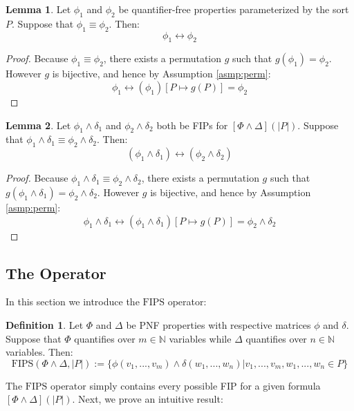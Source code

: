 \documentclass[12pt]{article}
\theoremstyle{definition}
\newtheorem{lemma}{Lemma}
\newtheorem{definition}{Definition}
\theoremstyle{remark}
\newcommand{\fips}{\text{FIPS}}
\begin{document}
\begin{lemma}
  \label{lem:phi-eqiv-bijec}
  Let $\phi_1$ and $\phi_2$ be quantifier-free properties parameterized by the sort $P$.  Suppose that $\phi_1 \equiv \phi_2$.  Then:
  $$\phi_1 \leftrightarrow \phi_2$$
\end{lemma}
\begin{proof}
  Because $\phi_1 \equiv \phi_2$, there exists a permutation $g$ such that $g(\phi_1) = \phi_2$.  However $g$ is bijective, and hence by Assumption \ref{asmp:perm}:
  $$\phi_1 \leftrightarrow (\phi_1)[P \mapsto g(P)] = \phi_2$$
\end{proof}

\begin{lemma}
  \label{lem:fip-eqiv-bijec}
  Let $\phi_1\land\delta_1$ and $\phi_2\land\delta_2$ both be FIPs for $[\Phi\land\Delta](|P|)$.  Suppose that $\phi_1\land\delta_1 \equiv \phi_2\land\delta_2$.  Then:
  $$(\phi_1 \land \delta_1) \leftrightarrow (\phi_2 \land \delta_2)$$
\end{lemma}
\begin{proof}
  Because $\phi_1\land\delta_1 \equiv \phi_2\land\delta_2$, there exists a permutation $g$ such that $g(\phi_1\land\delta_1) = \phi_2\land\delta_2$.  However $g$ is bijective, and hence by Assumption \ref{asmp:perm}:
  $$\phi_1\land\delta_1 \leftrightarrow (\phi_1\land\delta_1)[P \mapsto g(P)] = \phi_2\land\delta_2$$
\end{proof}

\subsection{The \fips Operator}

In this section we introduce the $\fips$ operator:
\begin{definition}
  Let $\Phi$ and $\Delta$ be PNF properties with respective matrices $\phi$ and $\delta$.  Suppose that $\Phi$ quantifies over $m \in \mathbb{N}$ variables while $\Delta$ quantifies over $n \in \mathbb{N}$ variables.  Then:
  $$\fips(\Phi \land \Delta, |P|) := \{\phi(v_1,...,v_m) \land \delta(w_1,...,w_n) | v_1,...,v_m,w_1,...,w_n \in P\}$$
\end{definition}

The $\fips$ operator simply contains every possible FIP for a given formula $[\Phi\land\Delta](|P|)$.  Next, we prove an intuitive result:
\end{document}
